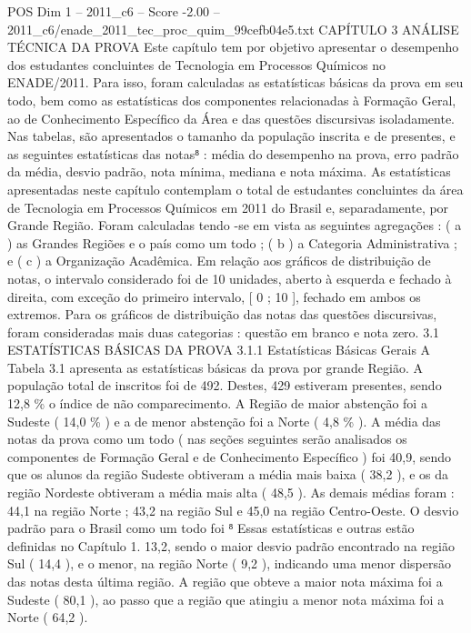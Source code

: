 \begin{textsample}{POS Dim 1 – 2011\_c6 – Score -2.00 – 2011\_c6/enade\_2011\_tec\_proc\_quim\_99cefb04e5.txt}  \label{ex:f1_pos_216}
CAPÍTULO 3 ANÁLISE TÉCNICA DA PROVA Este capítulo tem por objetivo apresentar o desempenho dos estudantes concluintes de Tecnologia em Processos Químicos no ENADE/2011.
Para isso, foram calculadas as estatísticas básicas da prova em seu todo, bem como as estatísticas dos componentes relacionadas à Formação Geral, ao de Conhecimento Específico da Área e das questões discursivas isoladamente.
Nas tabelas, são apresentados o tamanho da população inscrita e de presentes, e as seguintes estatísticas das notas⁸ : média do desempenho na prova, erro padrão da média, desvio padrão, nota mínima, mediana e nota máxima.
As estatísticas apresentadas neste capítulo contemplam o total de estudantes concluintes da área de Tecnologia em Processos Químicos em 2011 do Brasil e, separadamente, por Grande Região.
Foram calculadas tendo -se em vista as seguintes agregações : ( a ) as Grandes Regiões e o país como um todo ; ( b ) a Categoria Administrativa ; e ( c ) a Organização Acadêmica.
Em relação aos gráficos de distribuição de notas, o intervalo considerado foi de 10 unidades, aberto à esquerda e fechado à direita, com exceção do primeiro intervalo, [ 0 ; 10 ], fechado em ambos os extremos.
Para os gráficos de distribuição das notas das questões discursivas, foram consideradas mais duas categorias : questão em branco e nota zero. 3.1 ESTATÍSTICAS BÁSICAS DA PROVA 3.1.1 Estatísticas Básicas Gerais A Tabela 3.1 apresenta as estatísticas básicas da prova por grande Região.
A população total de inscritos foi de 492.
Destes, 429 estiveram presentes, sendo 12,8 \% o índice de não comparecimento.
A Região de maior abstenção foi a Sudeste ( 14,0 \% ) e a de menor abstenção foi a Norte ( 4,8 \% ).
A média das notas da prova como um todo ( nas seções seguintes serão analisados os componentes de Formação Geral e de Conhecimento Específico ) foi 40,9, sendo que os alunos da região Sudeste obtiveram a média mais baixa ( 38,2 ), e os da região Nordeste obtiveram a média mais alta ( 48,5 ).
As demais médias foram : 44,1 na região Norte ; 43,2 na região Sul e 45,0 na região Centro-Oeste.
O desvio padrão para o Brasil como um todo foi ⁸ Essas estatísticas e outras estão definidas no Capítulo 1. 13,2, sendo o maior desvio padrão encontrado na região Sul ( 14,4 ), e o menor, na região Norte ( 9,2 ), indicando uma menor dispersão das notas desta última região.
A região que obteve a maior nota máxima foi a Sudeste ( 80,1 ), ao passo que a região que atingiu a menor nota máxima foi a Norte ( 64,2 ).

\end{textsample}
